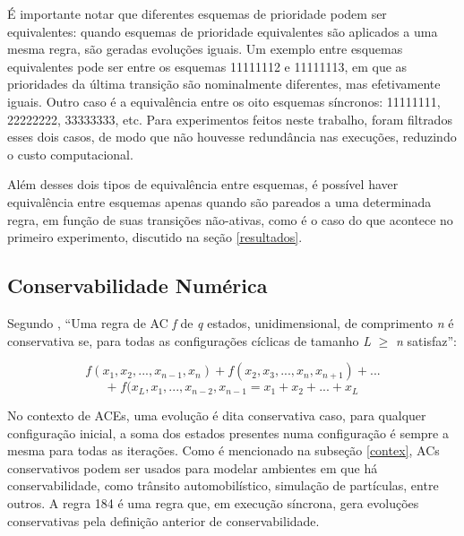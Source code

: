 \documentclass[a4paper,12pt]{ltxdoc}
\newcommand\tab[1][1cm]{\hspace*{#1}}
\begin{document}
\tab É importante notar que diferentes esquemas de prioridade podem ser equivalentes: quando esquemas de prioridade equivalentes são aplicados a uma mesma regra, são geradas evoluções iguais. Um exemplo entre esquemas equivalentes pode ser entre os esquemas 11111112 e 11111113, em que as prioridades da última transição são nominalmente diferentes, mas efetivamente iguais. Outro caso é a equivalência entre os oito esquemas síncronos: 11111111, 22222222, 33333333, etc. Para experimentos feitos neste trabalho, foram filtrados esses dois casos, de modo que não houvesse redundância nas execuções, reduzindo o custo computacional.

\tab Além desses dois tipos de equivalência entre esquemas, é possível haver equivalência entre esquemas apenas quando são pareados a uma determinada regra, em função de suas transições não-ativas, como é o caso do que acontece no primeiro experimento, discutido na seção \ref{resultados}.


\subsection{Conservabilidade Numérica} \label{num-conserv}
Segundo \cite{boccara2002number}, ``Uma regra de AC \textit{f} de \textit{q} estados, unidimensional, de comprimento \textit{n} é conservativa se, para todas as configurações cíclicas de tamanho \textit{L} \(\geq\) \textit{n} satisfaz'':

\[f(x_1,x_2,...,x_{n-1},x_n) + f(x_2,x_3,...,x_n,x_{n+1}) + ... \]
\tab \[ + \;   f(x_L,x_1,...,x_{n-2},x_{n-1} = x_1 + x_2 + ... + x_L\] 

\tab No contexto de ACEs, uma evolução é dita conservativa caso, para qualquer configuração inicial, a soma dos estados presentes numa configuração é sempre a mesma para todas as iterações. Como é mencionado na subseção \ref{contex}, ACs conservativos podem ser usados para modelar ambientes em que há conservabilidade, como trânsito automobilístico, simulação de partículas, entre outros. A regra 184 é uma regra que, em execução síncrona, gera evoluções conservativas pela definição anterior de conservabilidade. 
\end{document}
